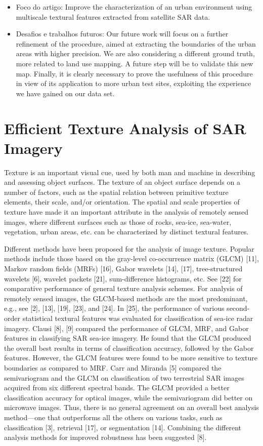 \documentclass[paper=a4, fontsize=11pt]{scrartcl}
\begin{document}
\begin{itemize}
    \item Foco do artigo: Improve the characterization of an urban environment using multiscale textural features extracted from satellite SAR data.
    \item Desafios e trabalhos futuros: Our future work will focus on a further refinement of the procedure, aimed at extracting the boundaries of the urban areas with higher precision. We are also considering a different ground truth, more related to land use mapping. A future step will be to validate this new map. Finally, it is clearly necessary to prove the usefulness of this procedure in view of its application to more urban test sites, exploiting the experience we have gained on our data set.
\end{itemize}

\newpage

\section*{\textcolor{VioletRed4}{Efficient Texture Analysis of SAR Imagery}}

Texture is an important visual cue, used by both man and machine in describing and assessing object surfaces.
The texture of an object surface depends on a number of factors, such as the spatial relation between primitive texture elements, their scale, and/or orientation. 
The spatial and scale properties of texture have made it an important attribute in the analysis of remotely sensed images, where different surfaces such as those of rocks, sea-ice, sea-water, vegetation, urban areas, etc. can be characterized by distinct textural features.

Different methods have been proposed for the analysis of image texture. 
Popular methods include those based on the gray-level co-occurrence matrix (GLCM) [11], Markov random fields (MRFs) [16], Gabor wavelets [14], [17], tree-structured wavelets [6], wavelet packets [21], sum-difference histograms, etc. 
See [22] for comparative performance of general texture analysis schemes. 
For analysis of remotely sensed images, the GLCM-based methods are the most predominant, e.g., see [2], [13], [19], [23], and [24].
In [25], the performance of various second-order statistical textural features was evaluated for classification of sea-ice radar imagery. 
Clausi [8], [9] compared the performance of GLCM, MRF, and Gabor features in classifying SAR sea-ice imagery. 
He found that the GLCM produced the overall best results in terms of classification accuracy, followed by the Gabor features. 
However, the GLCM features were found to be more sensitive to texture boundaries as compared to MRF. 
Carr and Miranda [5] compared the semivariogram and the GLCM on classification of two terrestrial SAR images acquired from six different spectral bands. 
The GLCM provided a better classification accuracy for optical images, while the semivariogram did better on microwave images. 
Thus, there is no general agreement on an overall best analysis method—one that outperforms all the others on various tasks, such as classification [3], retrieval [17], or segmentation [14]. 
Combining the different analysis methods for improved robustness has been suggested [8].
\end{document}

